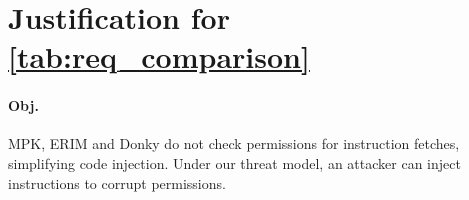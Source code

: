 \section{Justification for \autoref{tab:req_comparison}}
\label{app:justification_table1}

\paragraph{Obj. }
MPK, ERIM and Donky do not check permissions for instruction fetches, 
simplifying code injection.
Under our threat model, an attacker can inject  instructions 
to corrupt permissions.

